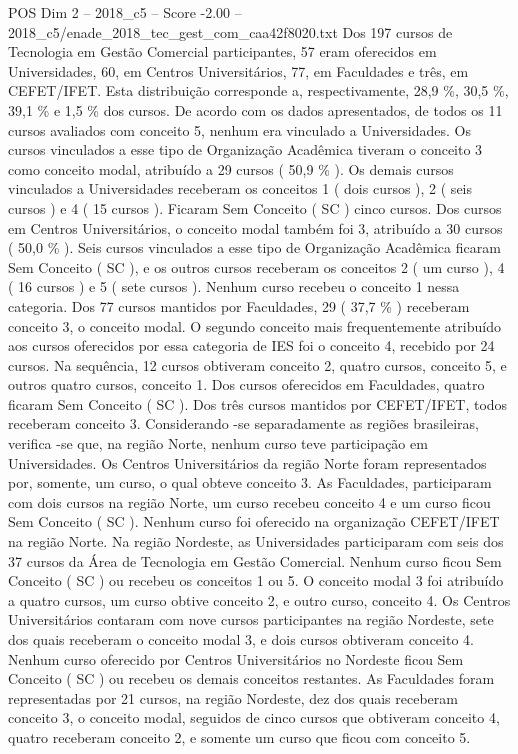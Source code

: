 \begin{textsample}{POS Dim 2 – 2018\_c5 – Score -2.00 – 2018\_c5/enade\_2018\_tec\_gest\_com\_caa42f8020.txt}
Dos 197 cursos de Tecnologia em Gestão Comercial participantes, 57 eram oferecidos em Universidades, 60, em Centros Universitários, 77, em Faculdades e três, em CEFET/IFET.
Esta distribuição corresponde a, respectivamente, 28,9 \%, 30,5 \%, 39,1 \% e 1,5 \% dos cursos.
De acordo com os dados apresentados, de todos os 11 cursos avaliados com conceito 5, nenhum era vinculado a Universidades.
Os cursos vinculados a esse tipo de Organização Acadêmica tiveram o conceito 3 como conceito modal, atribuído a 29 cursos ( 50,9 \% ).
Os demais cursos vinculados a Universidades receberam os conceitos 1 ( dois cursos ), 2 ( seis cursos ) e 4 ( 15 cursos ).
Ficaram Sem Conceito ( SC ) cinco cursos.
Dos cursos em Centros Universitários, o conceito modal também foi 3, atribuído a 30 cursos ( 50,0 \% ).
Seis cursos vinculados a esse tipo de Organização Acadêmica ficaram Sem Conceito ( SC ), e os outros cursos receberam os conceitos 2 ( um curso ), 4 ( 16 cursos ) e 5 ( sete cursos ).
Nenhum curso recebeu o conceito 1 nessa categoria.
Dos 77 cursos mantidos por Faculdades, 29 ( 37,7 \% ) receberam conceito 3, o conceito modal.
O segundo conceito mais frequentemente atribuído aos cursos oferecidos por essa categoria de IES foi o conceito 4, recebido por 24 cursos.
Na sequência, 12 cursos obtiveram conceito 2, quatro cursos, conceito 5, e outros quatro cursos, conceito 1.
Dos cursos oferecidos em Faculdades, quatro ficaram Sem Conceito ( SC ).
Dos três cursos mantidos por CEFET/IFET, todos receberam conceito 3.
Considerando -se separadamente as regiões brasileiras, verifica -se que, na região Norte, nenhum curso teve participação em Universidades.
Os Centros Universitários da região Norte foram representados por, somente, um curso, o qual obteve conceito 3.
As Faculdades, participaram com dois cursos na região Norte, um curso recebeu conceito 4 e um curso ficou Sem Conceito ( SC ).
Nenhum curso foi oferecido na organização CEFET/IFET na região Norte.
Na região Nordeste, as Universidades participaram com seis dos 37 cursos da Área de Tecnologia em Gestão Comercial.
Nenhum curso ficou Sem Conceito ( SC ) ou recebeu os conceitos 1 ou 5.
O conceito modal 3 foi atribuído a quatro cursos, um curso obtive conceito 2, e outro curso, conceito 4.
Os Centros Universitários contaram com nove cursos participantes na região Nordeste, sete dos quais receberam o conceito modal 3, e dois cursos obtiveram conceito 4.
Nenhum curso oferecido por Centros Universitários no Nordeste ficou Sem Conceito ( SC ) ou recebeu os demais conceitos restantes.
As Faculdades foram representadas por 21 cursos, na região Nordeste, dez dos quais receberam conceito 3, o conceito modal, seguidos de cinco cursos que obtiveram conceito 4, quatro receberam conceito 2, e somente um curso que ficou com conceito 5.

\end{textsample}
